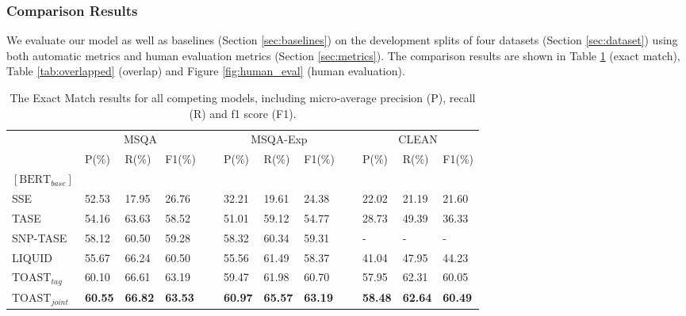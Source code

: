 \documentclass[a4paper]{cas-sc}
\newcommand{\1}[1]{\mathds{1}\left[#1\right]}
\newcommand{\secref}[1]{Section \ref{#1}}
\newcommand{\figref}[1]{Figure \ref{#1}}
\newcommand{\tableref}[1]{Table \ref{#1}}
\begin{document}
\subsubsection{Comparison Results}
\label{sec:comparison}
We evaluate our model as well as baselines (\secref{sec:baselines}) on the development splits of four datasets (\secref{sec:dataset}) using both automatic metrics and human evaluation metrics (\secref{sec:metrics}). 
The comparison results are shown in \tableref{tab:exact_match} (exact match), \tableref{tab:overlapped} (overlap) and \figref{fig:human_eval} (human evaluation). 


\begin{table}[width=\textwidth,cols=4,pos=h]
	\caption{The Exact Match results for all competing models, including micro-average precision (P), recall (R) and f1 score (F1). }
	\label{tab:exact_match}
	\begin{tabular*}{\tblwidth}{@{}p{2.2cm}p{1.0cm}p{1.0cm}p{1.0cm}cp{1.0cm}p{1.0cm}p{1.0cm}cp{1.0cm}p{1.0cm}p{1.0cm}@{}}
		\toprule[0.3mm]
		\multicolumn{1}{l}{}  & \multicolumn{3}{c}{MSQA}  & \multicolumn{1}{l}{}  & \multicolumn{3}{c}{MSQA-Exp} & \multicolumn{1}{l}{} & \multicolumn{3}{c}{CLEAN} \\ 
		\cline{2-4} \cline{6-8} \cline{10-12}
		\addlinespace
		& P(\%)  & R(\%)  & F1(\%)  &  ~& P(\%)    & R(\%)   & F1(\%)  & ~ & P(\%)   & R(\%)  & F1(\%)  \\
		\toprule[0.3mm]
		$\left[\text{BERT}_{base}\right]$ & & & & & & & & & \\ \midrule
		SSE              & 52.53 & 17.95  & 26.76  & & 32.21    & 19.61   & 24.38  &  & 22.02   & 21.19  & 21.60  \\
		TASE                 & 54.16  & 63.63  & 58.52  & & 51.01    & 59.12   & 54.77  &  & 28.73   & 49.39  & 36.33  \\
		SNP-TASE              & 58.12  & 60.50 & 59.28 &  & 58.32   & 60.34 & 59.31  & & -   & -  & -  \\
		LIQUID  & 55.67  &66.24  & 60.50 &  & 55.56   & 61.49  & 58.37 &  & 41.04  & 47.95  & 44.23 \\
		$\text{TOAST}_{tag}$           & 60.10  & 66.61  & 63.19  &  & 59.47    & 61.98   &  60.70  &  & 57.95   & 62.31  & 60.05  \\
		$\text{TOAST}_{joint}$          & \textbf{60.55}  & \textbf{66.82}  & \textbf{63.53}  & & \textbf{60.97}    & \textbf{65.57}   & \textbf{63.19}   & &  \textbf{58.48}  & \textbf{62.64}   & \textbf{60.49}  \\ 

\end{tabular*}
\end{table}
\end{document}
